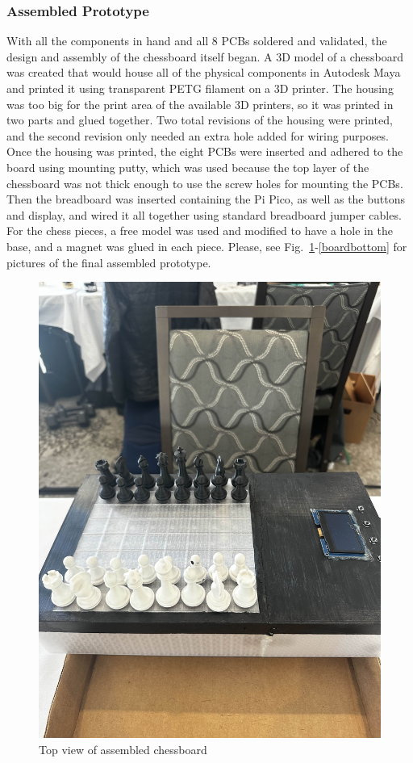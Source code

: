 \documentclass[11pt,journal]{IEEEtran}
\begin{document}
\subsubsection{Assembled Prototype}
With all the components in hand and all 8 PCBs soldered and validated, the design and assembly of the chessboard itself began. A 3D model of a chessboard was created that would house all of the physical components in Autodesk Maya and printed it using transparent PETG filament on a 3D printer. The housing was too big for the print area of the available 3D printers, so it was printed in two parts and glued together. Two total revisions of the housing were printed, and the second revision only needed an extra hole added for wiring purposes. Once the housing was printed, the eight PCBs were inserted and adhered to the board using mounting putty, which was used because the top layer of the chessboard was not thick enough to use the screw holes for mounting the PCBs. Then the breadboard was inserted containing the Pi Pico, as well as the buttons and display, and wired it all together using standard breadboard jumper cables. For the chess pieces, a free model was used and modified to have a hole in the base, and a magnet was glued in each piece. Please, see Fig.~\ref{boardtop}-\ref{boardbottom} for pictures of the final assembled prototype.
\begin{figure}[ht]
  \includegraphics[width=\linewidth]{boardTop.jpg}
  \caption{Top view of assembled chessboard}
  \label{boardtop}
\end{figure}
\end{document}

